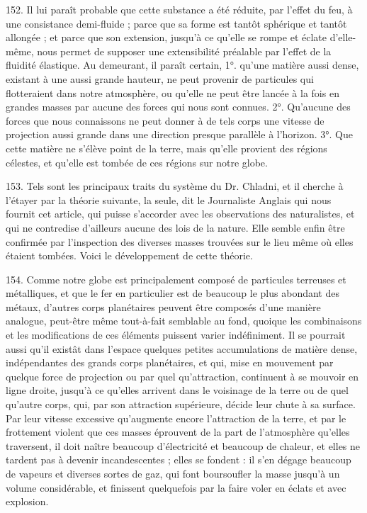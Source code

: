 \documentclass[a4paper, 11pt, oneside, polutonikogreek, french]{article}
\begin{document}
152. \og Il lui paraît probable que cette substance a été réduite, par l'effet du feu, à une consistance demi-fluide ; parce que sa forme est tantôt sphérique et tantôt allongée ; et parce que son extension, jusqu'à ce qu'elle se rompe et éclate d'elle-même, nous permet de supposer une extensibilité préalable par l'effet de la fluidité élastique. Au demeurant, il paraît certain, 1°. qu'une matière aussi dense, existant à une aussi grande hauteur, ne peut provenir de particules qui flotteraient dans notre atmosphère, ou qu'elle ne peut être lancée à la fois en grandes masses par aucune des forces qui nous sont connues. 2°. Qu'aucune des forces que nous connaissons ne peut donner à de tels corps une vitesse de projection aussi grande dans une direction presque parallèle à l'horizon. 3°. Que cette matière ne s'élève point de la terre, mais qu'elle provient des régions célestes, et qu'elle est tombée de ces régions sur notre globe. \fg

153. Tels sont les principaux traits du système du Dr. Chladni, et il cherche à l'étayer par la théorie suivante, la seule, dit le Journaliste Anglais qui nous fournit cet article, qui puisse s'accorder avec les observations des naturalistes, et qui ne contredise d'ailleurs aucune des lois de la nature. Elle semble enfin être confirmée par l'inspection des diverses masses trouvées sur le lieu même où elles étaient tombées. Voici le développement de cette théorie.

154. \og Comme notre globe est principalement composé de particules terreuses et métalliques, et que le fer en particulier est de beaucoup le plus abondant des métaux, d'autres corps planétaires peuvent être composés d'une manière analogue, peut-être même tout-à-fait semblable au fond, quoique les combinaisons et les modifications de ces éléments puissent varier indéfiniment. Il se pourrait aussi qu'il existât dans l'espace quelques petites accumulations de matière dense, indépendantes des grands corps planétaires, et qui, mise en mouvement par quelque force de projection ou par quel qu’attraction, continuent à se mouvoir en ligne droite, jusqu'à ce qu'elles arrivent dans le voisinage de la terre ou de quel qu’autre corps, qui, par son attraction supérieure, décide leur chute à sa surface. Par leur vitesse excessive qu'augmente encore l'attraction de la terre, et par le frottement violent que ces masses éprouvent de la part de l'atmosphère qu'elles traversent, il doit naître beaucoup d'électricité et beaucoup de chaleur, et elles ne tardent pas à devenir incandescentes ; elles se fondent : il s'en dégage beaucoup de vapeurs et diverses sortes de gaz, qui font boursoufler la masse jusqu'à un volume considérable, et finissent quelquefois par la faire voler en éclats et avec explosion. \fg
\end{document}
